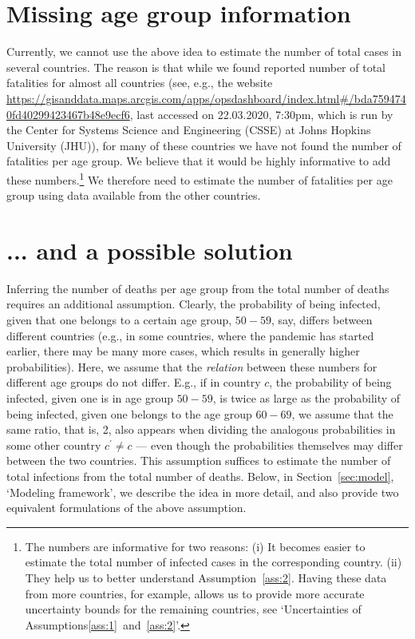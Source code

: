 \documentclass[a4paper]{article}
\begin{document}
\section{Missing age group information} \label{sec:noage}
Currently, we cannot use the above idea to 
estimate the number of total cases in 
several countries. The reason is that 
while we found reported number of total fatalities 
for almost all countries 
(see, e.g., the website {\footnotesize
\url{https://gisanddata.maps.arcgis.com/apps/opsdashboard/index.html#/bda7594740fd40299423467b48e9ecf6}},
last accessed on 22.03.2020, 7:30pm,
which is run by the Center for Systems Science and Engineering ({CSSE}) at Johns Hopkins University ({JHU})), 
for many of these countries we have not found the number of fatalities per age group. 
We believe that it would be highly informative to add these numbers.\footnote{The numbers 
are informative for two reasons: (i) It
becomes easier to estimate the 
total number of infected cases in the 
corresponding country.
(ii) They help us to better understand Assumption~\ref{ass:2}. Having these data from 
more countries, for example, 
allows us to 
provide more accurate uncertainty bounds for 
the remaining countries, see `Uncertainties of Assumptions\ref{ass:1}~and~\ref{ass:2}'.}
We therefore need to estimate the number of fatalities per age group using data available from the other countries.


\section{... and a possible solution}
Inferring the number of deaths per age group from the total number of deaths requires an additional assumption. 
Clearly, 
the probability of
being infected, given that one 
belongs to a certain age group, $50-59$, say, 
differs between different countries (e.g., in some countries, 
where the pandemic has started earlier, there may be many more cases, which results in generally higher probabilities).
Here, we assume that the \emph{relation} between these numbers for different age groups do not differ.
E.g., if 
in country $c$, the
probability of being infected, given one is in age group $50-59$,
is twice as large as the probability of being infected, given 
one belongs to the age group $60-69$, 
we assume that the same ratio, that is, 2, 
also appears when dividing the analogous probabilities in some other country $c^\prime \neq c$ --- even though the probabilities themselves may differ between the two countries. 
This assumption suffices to estimate the number of total infections
from the total number of deaths.
Below, in Section~\ref{sec:model}, `Modeling framework', we describe the idea in more detail, 
and also provide two equivalent formulations of the above assumption. 
\end{document}
